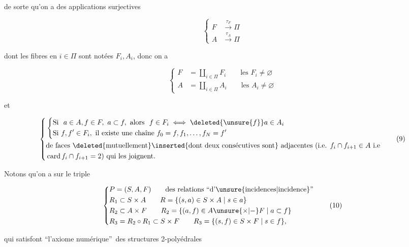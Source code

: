 de sorte qu'on a des applications surjectives

\[
\left\{\begin{aligned}
 F&\xrightarrow{\tau_F}\Pi\\
 A&\xrightarrow{\tau_A}\Pi
\end{aligned}\right.\tag*{(7)}
\]

dont les fibres en $i\in\Pi$ sont notées $F_i,A_i$, donc on a

\[
\left\{\begin{aligned}
 F&=\coprod_{i\in\Pi}F_i\qquad\text{les }F_i\ne\varnothing\\
 A&=\coprod_{i\in\Pi}A_i\qquad\text{les }A_i\ne\varnothing
\end{aligned}\right.\tag*{(8)}
\]

et

\[
\left\{\begin{aligned}
 &\left\{\begin{aligned}
 &\text{Si }\ a\in A,f\in F,\ a\subset f,\ \text{alors }\ f\in F_i\iff \deleted{\unsure{f}}a\in A_i\\
 &\text{Si }f,f'\in F_i,\ \text{il existe une chaîne }f_0=f,f_1,\ldots,f_N=f'
 \end{aligned}\right.\\
 &\text{de faces \deleted{mutuellement}\inserted{dont deux consécutives sont} adjacentes (i.e. }f_i\cap f_{i+1}\in A\text{ i.e}\\
 &\operatorname{card} f_i\cap f_{i+1}=2\text{) qui les joignent.}
\end{aligned}\right.\tag*{(9)}
\]

Notons qu'on a sur le triple

\[
\left\{\begin{aligned}
 &P=(S,A,F)\qquad\text{des relations ``d'\unsure{incidences|incidence}''}\\
 &R_1\subset S\times A\qquad R=\{(s,a)\in S\times A\mid s\in a\}\\
 &R_2\subset A\times F\qquad R_2=\{(a,f)\in A\unsure{\times|-} F\mid a\subset f\}\\
 &R_3=R_2\circ R_1\subset S\times F\qquad R_3=\{(s,f)\in S\times F\mid s\in f\},
\end{aligned}\right.\tag*{(10)}
\]


qui satisfont ``l'axiome numérique''\ des structures 2-polyédrales

